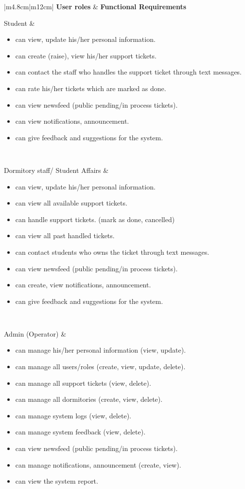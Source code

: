 \begin{longtable}{{|m{4.8cm}|m{12cm}|}} 
	\hline
	\textbf{User roles} & \textbf{Functional Requirements}\\ \hline
	\endhead
	
	Student & 	
	\begin{itemize}
		\item can view, update his/her personal information.
		\item can create (raise), view his/her support tickets. 
		\item can contact the staff who handles the support ticket through text messages.
		\item can rate his/her tickets which are marked as done.
		\item can view newsfeed (public pending/in process tickets).
		\item can view notifications, announcement.
		\item can give feedback and suggestions for the system.
	\end{itemize}
	
	\\ \hline
	
	Dormitory staff/ Student Affairs & 	
	\begin{itemize}
		\item can view, update his/her personal information.
		\item can view all available support tickets.
		\item can handle support tickets. (mark as done, cancelled)
		\item can view all past handled tickets.
		\item can contact students who owns the ticket through text messages.
		\item can view newsfeed (public pending/in process tickets).
		\item can create, view notifications, announcement. 
		\item can give feedback and suggestions for the system.
	\end{itemize}
	
	\\ \hline
	
	
	Admin (Operator) & 	
	\begin{itemize}
		\item can manage his/her personal information (view, update).
		\item can manage all users/roles (create, view, update, delete).
		\item can manage all support tickets (view, delete).
		\item can manage all dormitories (create, view, delete).
		\item can manage system logs (view, delete).
		\item can manage system feedback (view, delete).
		\item can view newsfeed (public pending/in process tickets).
		\item can manage notifications, announcement (create, view). 
		\item can view the system report.
	\end{itemize}
	

\end{longtable}
